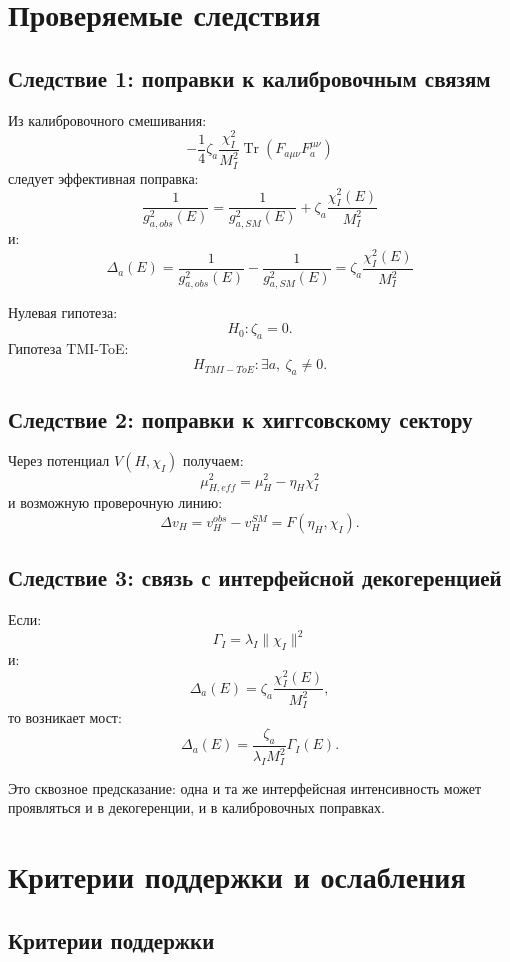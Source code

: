 \documentclass[12pt,a4paper]{article}
\DeclareMathOperator{\Tr}{Tr}
\begin{document}
\section{Проверяемые следствия}

\subsection{Следствие 1: поправки к калибровочным связям}

Из калибровочного смешивания:
\[
-\frac14\zeta_a\frac{\chi_I^2}{M_I^2}\Tr(F_{a\mu\nu}F_a^{\mu\nu})
\]
следует эффективная поправка:
\[
\boxed{
\frac{1}{g_{a,obs}^2(E)}=
\frac{1}{g_{a,SM}^2(E)}+
\zeta_a\frac{\chi_I^2(E)}{M_I^2}
}
\]
и:
\[
\boxed{
\Delta_a(E)=
\frac{1}{g_{a,obs}^2(E)}-
\frac{1}{g_{a,SM}^2(E)}=
\zeta_a\frac{\chi_I^2(E)}{M_I^2}
}
\]

Нулевая гипотеза:
\[
\boxed{H_0:\zeta_a=0}.
\]
Гипотеза TMI-ToE:
\[
\boxed{H_{TMI-ToE}:\exists a,\ \zeta_a\neq0}.
\]

\subsection{Следствие 2: поправки к хиггсовскому сектору}

Через потенциал $V(H,\chi_I)$ получаем:
\[
\boxed{\mu_{H,eff}^2=\mu_H^2-\eta_H\chi_I^2}
\]
и возможную проверочную линию:
\[
\boxed{\Delta v_H=v_H^{obs}-v_H^{SM}=F(\eta_H,\chi_I)}.
\]

\subsection{Следствие 3: связь с интерфейсной декогеренцией}

Если:
\[
\Gamma_I=\lambda_I\|\chi_I\|^2
\]
и:
\[
\Delta_a(E)=\zeta_a\frac{\chi_I^2(E)}{M_I^2},
\]
то возникает мост:
\[
\boxed{\Delta_a(E)=\frac{\zeta_a}{\lambda_I M_I^2}\Gamma_I(E)}.
\]

Это сквозное предсказание: одна и та же интерфейсная интенсивность может проявляться и в декогеренции, и в калибровочных поправках.

\section{Критерии поддержки и ослабления}

\subsection{Критерии поддержки}
\end{document}
